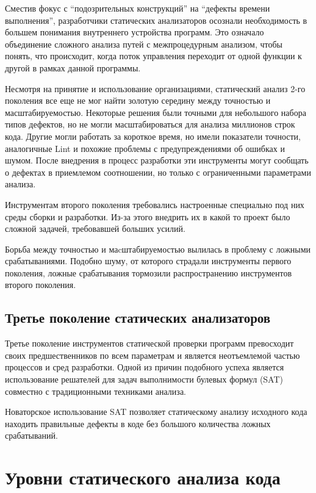 Сместив фокус с ``подозрительных конструкций'' на ``дефекты времени выполнения'', разработчики 
статических анализаторов осознали необходимость в большем понимания внутреннего 
устройства программ. Это означало объединение сложного анализа путей с межпроцедурным анализом, 
чтобы понять, что происходит, когда поток управления переходит от одной функции к другой в 
рамках данной программы.

Несмотря на принятие и использование организациями, статический анализ 2-го поколения все еще 
не мог найти золотую середину между точностью и масштабируемостью. Некоторые решения были 
точными для небольшого набора типов дефектов, но не могли масштабироваться для анализа 
миллионов строк кода. Другие могли работать за короткое время, но имели показатели точности, 
аналогичные Lint и похожие проблемы с предупреждениями об ошибках и шумом. После 
внедрения в процесс разработки эти инструменты могут сообщать о дефектах в приемлемом 
соотношении, но только с ограниченными параметрами анализа. 

Инструментам второго поколения требовались настроенные специально под них среды сборки и разработки. 
Из-за этого внедрить их в какой то проект было сложной задачей, требовавшей больших усилий.

Борьба между точностью и маcштабируемостью вылилась в проблему с ложными срабатываниями. Подобно 
шуму, от которого страдали инструменты первого поколения, ложные срабатывания тормозили 
распространению инструментов второго поколения. 

\subsection{Третье поколение статических анализаторов}
Третье поколение инструментов статической проверки программ превосходит своих предшественников по
всем параметрам и является неотъемлемой частью процессов и сред разработки. Одной из причин подобного успеха является использование решателей для
задач выполнимости булевых формул (SAT) совместно с традиционными техниками анализа.\cite{}

Новаторское использование SAT позволяет статическому анализу исходного кода находить правильные дефекты 
в коде без большого количества ложных срабатываний.

\section{Уровни статического анализа кода}

